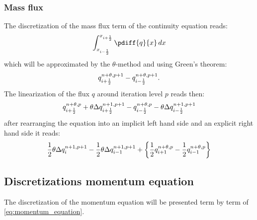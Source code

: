 \subsubsection{Mass flux}
The discretization of the mass flux term of the continuity equation reads:
\begin{align}
    \int^{x_{i+\half}}_{x_{i-\half}} \pdiff{q}{x} \,dx
\end{align}
which will be approximated by the $\theta$-method and using Green's theorem:
\begin{align}
q^{n+\theta, p+1}_{i+\frac{1}{2}} - q^{n+\theta, p+1}_{i-\frac{1}{2}}.
\end{align}
The linearization of the flux $q$ around iteration level $p$ reads then:
\begin{align}
    q^{n+\theta,p}_{i+\frac{1}{2}}  + \theta \Delta q^{n+1, p+1}_{i+\frac{1}{2}}
    - q^{n+\theta,p}_{i-\frac{1}{2}}  - \theta \Delta q^{n+1, p+1}_{i-\frac{1}{2}}
\end{align}
after rearranging the equation into an implicit left hand side and an explicit right hand side  it reads:
\begin{align}
\frac{1}{2}  \theta \Delta q^{n+1, p+1}_{i} - \frac{1}{2} \theta \Delta q^{n+1, p+1}_{i-1} + \left\{ \frac{1}{2} q^{n+\theta,p}_{i+1}  - \frac{1}{2} q^{n+\theta,p}_{i-1} \right\}
\end{align}

\subsection{Discretizations momentum equation}
The discretization of the momentum equation will be presented term by term of \autoref{eq:momentum_equation}.
